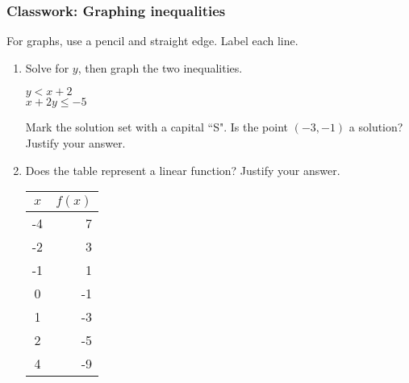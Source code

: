 \documentclass[12pt, twoside]{article}
\begin{document}
\subsubsection*{Classwork: Graphing inequalities}
For graphs, use a pencil and straight edge. Label each line.
  \begin{enumerate}

\item Solve for $y$, then graph the two inequalities.

  \begin{multicols}{2}
    $y < x+2$ \\
    $x+2y \leq -5$
  \end{multicols}
  \vspace{2.5cm}

  \begin{center} %
  \end{center}

  Mark the solution set with a capital ``S". Is the point $(-3,-1)$ a solution? Justify your answer.
\newpage

\item Does the table represent a linear function? Justify your answer.
  \renewcommand{\arraystretch}{1.6}
    \begin{center}
      \begin{tabular}{|c|r|}
      \hline
      $x$ & $f(x)$\\
      \hline
      -4 & 7 \\
      \hline
      -2 & 3 \\
      \hline
      -1 & 1 \\
      \hline
      0 & -1 \\
      \hline
      1 & -3 \\
      \hline
      2 & -5 \\
      \hline
      4 & -9 \\
      \hline
      \end{tabular}
    \end{center}
    \newpage
  \end{enumerate}
\end{document}
